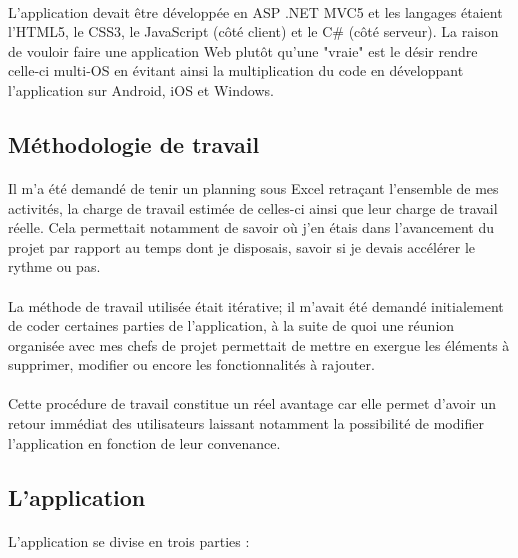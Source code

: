 \documentclass[12pt]{report}
\begin{document}
\paragraph{}
L'application devait être développée en ASP .NET MVC5 et les langages étaient l'HTML5, le CSS3, le JavaScript (côté client) et le C\# (côté serveur). La raison de vouloir faire une application Web plutôt qu'une "vraie" est le désir rendre celle-ci multi-OS en évitant ainsi la multiplication du code en développant l'application sur Android, iOS et Windows.

\subsection{Méthodologie de travail}
\paragraph{}
Il m'a été demandé de tenir un planning sous Excel retraçant l'ensemble de mes activités, la charge de travail estimée de celles-ci ainsi que leur charge de travail réelle.
Cela permettait notamment de savoir où j'en étais dans l'avancement du projet par rapport au temps dont je disposais, savoir si je devais accélérer le rythme ou pas.

\paragraph{}
La méthode de travail utilisée était itérative; il m’avait été demandé initialement de coder certaines parties de l’application, à la suite de quoi une réunion organisée avec mes chefs de projet permettait de mettre en exergue les éléments à supprimer, modifier ou encore les fonctionnalités à rajouter.

\paragraph{}
Cette procédure de travail constitue un réel avantage car elle permet d’avoir un retour immédiat des utilisateurs  laissant notamment la possibilité de modifier l’application en fonction de leur convenance. 

\subsection{L'application}
\paragraph{}
L'application se divise en trois parties :
\end{document}
